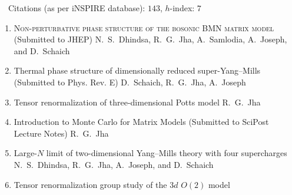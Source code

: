  {\faLeanpub}
~~Citations (as per iNSPIRE database): $143$, $h$-index: $7$
\begin{enumerate}
\item \textsc{Non-perturbative phase structure of the bosonic BMN matrix model}  \newline 
\hfill  \texttt{\textbf{}} (Submitted to JHEP) \newline 
N.~S.~Dhindsa, R.~G.~Jha, A.~Samlodia, A.~Joseph, and D.~Schaich
\vspace{1mm} 
\item Thermal phase structure of dimensionally reduced super-Yang--Mills \newline 
\texttt{\textbf{}} (Submitted to Phys. Rev. E) \newline 
D.~Schaich, R.~G.~Jha, A.~Joseph
\vspace{1mm} 
\item Tensor renormalization of three-dimensional Potts model  \newline 
\texttt{\textbf{}} \newline 
R.~G.~Jha
\vspace{1mm} 
 \item Introduction to Monte Carlo for Matrix Models \newline 
 \texttt{\textbf{}} (Submitted to SciPost Lecture Notes) \newline 
 R.~G.~Jha
 \vspace{1mm} 
 \item Large-$N$ limit of two-dimensional Yang--Mills theory with four supercharges \newline 
 \texttt{\textbf{}} \newline 
 N.~S.~Dhindsa, R.~G.~Jha, A.~Joseph, and D.~Schaich
 \vspace{1mm}  
 \item Tensor renormalization group study of the $3d$ $O(2)$ model \newline 

\end{enumerate}
